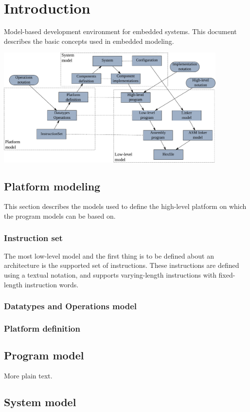 \documentclass{article}
\begin{document}
\section{Introduction}

Model-based development environment for embedded systems. This document
describes the basic concepts used in embedded modeling.

\includegraphics[width=115mm]{graphics/MODembed.pdf}

\subsection{Platform modeling}

This section describes the models used to define the high-level platform on
which the program models can be based on.

\subsubsection{Instruction set}

The most low-level model and the first thing is to be defined about an
architecture is the supported set of instructions. These instructions
are defined using a textual notation, and supports varying-length instructions
with fixed-length instruction words.



\subsubsection{Datatypes and Operations model}

\subsubsection{Platform definition}

\subsection{Program model}

More plain text.

\subsection{System model}
\end{document}
